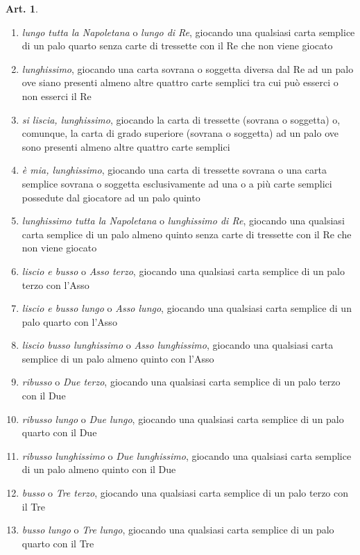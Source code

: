 \documentclass[italian,a4paper]{book}
\theoremstyle{definition}
\newtheorem{art}{Art.}
\newenvironment{packedenum}{
\begin{enumerate}
  \setlength{\itemsep}{1pt}
  \setlength{\parskip}{0pt}
  \setlength{\parsep}{0pt}
}{\end{enumerate}}
\begin{document}
\begin{art}
\begin{packedenum}
semplice sovrana o soggetta esclusivamente ad una o a più carte semplici
possedute dal giocatore ad un palo quarto 
\item      \emph{lungo tutta la Napoletana} o \emph{lungo di Re}, giocando una qualsiasi
carta semplice di un palo quarto senza carte di tressette con il Re che non
viene giocato
\item      \emph{lunghissimo}, giocando una carta sovrana o soggetta diversa dal Re
ad un palo ove siano presenti almeno altre quattro carte semplici tra cui
può esserci o non esserci il Re
\item      \emph{si liscia, lunghissimo}, giocando la carta di tressette (sovrana o
soggetta) o, comunque, la carta di grado superiore (sovrana o soggetta) ad
un palo ove sono  presenti almeno altre quattro carte semplici
\item      \emph{è mia, lunghissimo}, giocando una carta di tressette sovrana o una
carta semplice sovrana o soggetta esclusivamente ad una o a più carte
semplici possedute dal giocatore ad un palo quinto
\item      \emph{lunghissimo tutta la Napoletana} o \emph{lunghissimo di Re}, giocando una
qualsiasi carta semplice di un palo almeno quinto senza carte di tressette
con il Re che non viene giocato
\item      \emph{liscio e busso} o \emph{Asso terzo}, giocando una qualsiasi carta semplice
di un palo terzo con l’Asso
\item      \emph{liscio e busso lungo} o \emph{Asso lungo}, giocando una qualsiasi carta
semplice di un palo quarto con l’Asso
\item      \emph{liscio  busso lunghissimo} o \emph{Asso lunghissimo}, giocando una
qualsiasi carta semplice di un palo almeno quinto con l’Asso
\item      \emph{ribusso} o \emph{Due terzo}, giocando una qualsiasi carta semplice di un
palo terzo con il Due
\item      \emph{ribusso lungo} o \emph{Due lungo}, giocando una qualsiasi carta semplice
di un palo quarto con il Due
\item      \emph{ribusso lunghissimo} o \emph{Due lunghissimo}, giocando una qualsiasi
carta semplice di un palo almeno quinto con il Due
\item      \emph{busso} o \emph{Tre terzo}, giocando una qualsiasi carta semplice di un
palo terzo con il Tre
\item      \emph{busso lungo} o \emph{Tre lungo}, giocando una qualsiasi carta semplice di
un palo quarto con il Tre

\end{packedenum}
\end{art}
\end{document}
